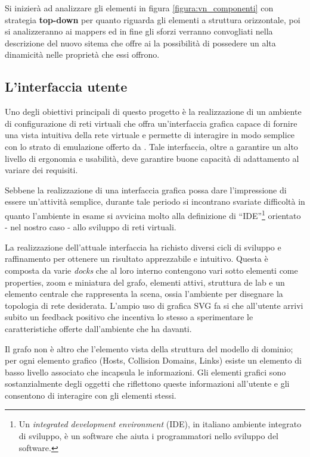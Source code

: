 Si inizierà ad analizzare gli elementi in figura \ref{figura:vn_componenti} con strategia \textbf{top-down} per quanto riguarda gli elementi a struttura orizzontale, poi si analizzeranno ai mappers ed in fine gli sforzi verranno convogliati nella descrizione del nuovo sitema che offre ai \plugin{} la possibilità di possedere un alta dinamicità nelle proprietà che essi offrono.

\subsection{L'interfaccia utente}
Uno degli obiettivi principali di questo progetto è la realizzazione di un ambiente di configurazione di reti virtuali che offra un'interfaccia grafica capace di fornire una vista intuitiva della rete virtuale  e permette di interagire in modo semplice con lo strato di emulazione offerto da \netkit{}.
Tale interfaccia, oltre a garantire un alto livello di ergonomia e usabilità, deve garantire buone capacità di adattamento al variare dei requisiti.

Sebbene la realizzazione di una interfaccia grafica possa dare l'impressione di essere un'attività semplice, durante tale periodo si incontrano svariate difficoltà in quanto l'ambiente in esame si avvicina molto alla definizione di ``IDE''\footnote{Un \textit{integrated development environment} (IDE), in italiano ambiente integrato di sviluppo, è un software che aiuta i programmatori nello sviluppo del software.} orientato - nel nostro caso - allo sviluppo di reti virtuali.

La realizzazione dell'attuale interfaccia ha richisto diversi cicli di sviluppo e raffinamento per ottenere un risultato apprezzabile e intuitivo. Questa è composta da varie \emph{docks} che al loro interno contengono vari sotto elementi come properties, zoom e miniatura del grafo, elementi attivi, struttura de lab e un elemento centrale che rappresenta la scena, ossia l'ambiente per disegnare la topologia di rete desiderata. L'ampio uso di grafica SVG fa si che all'utente arrivi subito un feedback positivo che incentiva lo stesso a sperimentare le caratteristiche offerte dall'ambiente che ha davanti.

Il grafo non è altro che l'elemento vista della struttura del modello di dominio; per ogni elemento grafico (Hosts, Collision Domains, Links) esiste un elemento di basso livello associato che incapsula le informazioni. Gli elementi grafici sono sostanzialmente degli oggetti che riflettono queste informazioni all'utente e gli consentono di interagire con gli elementi stessi.

